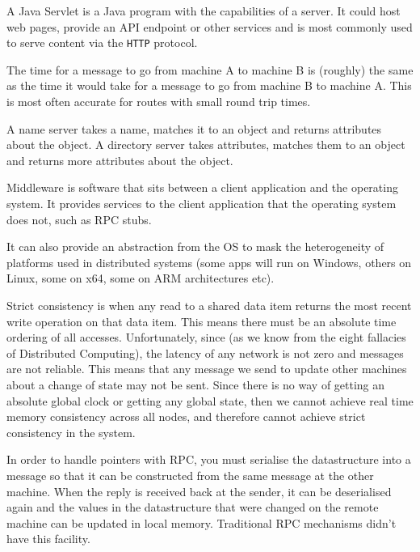 
A Java Servlet is a Java program with the capabilities of a server. It could
host web pages, provide an API endpoint or other services and is most commonly
used to serve content via the \texttt{HTTP} protocol.


The time for a message to go from machine A to machine B is (roughly) the same
as the time it would take for a message to go from machine B to machine A. This
is most often accurate for routes with small round trip times.


A name server takes a name, matches it to an object and returns attributes about
the object. A directory server takes attributes, matches them to an object and
returns more attributes about the object.


Middleware is software that sits between a client application and the operating
system. It provides services to the client application that the operating system
does not, such as RPC stubs.

It can also provide an abstraction from the OS to mask the heterogeneity of
platforms used in distributed systems (some apps will run on Windows, others on
Linux, some on x64, some on ARM architectures etc).


Strict consistency is when any read to a shared data item returns the most
recent write operation on that data item. This means there must be an absolute
time ordering of all accesses. Unfortunately, since (as we know from the eight
fallacies of Distributed Computing), the latency of any network is not zero and
messages are not reliable. This means that any message we send to update other
machines about a change of state may not be sent. Since there is no way of
getting an absolute global clock or getting any global state, then we cannot
achieve real time memory consistency across all nodes, and therefore cannot
achieve strict consistency in the system.


In order to handle pointers with RPC, you must serialise the datastructure into
a message so that it can be constructed from the same message at the other
machine. When the reply is received back at the sender, it can be deserialised
again and the values in the datastructure that were changed on the remote
machine can be updated in local memory. Traditional RPC mechanisms didn't have
this facility.
